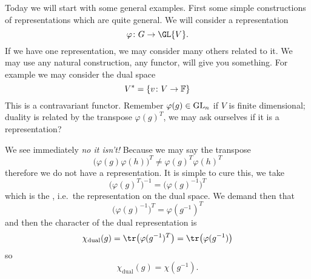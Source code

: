 
Today we will start with some general examples. First some simple
constructions of representations which are quite general. We will
consider a representation
\begin{equation}
\varphi\colon G\to\GL{V}.
\end{equation}
If we have one representation, we may consider many others
related to it. We may use any natural construction, any functor,
will give you something. For example we may consider the dual
space 
\begin{equation}
V^{*}=\left\{ v\colon V\to\Bbb{F}\right\}
\end{equation}
This is a contravariant functor. Remember $\varphi(g)\in{\rm
  GL}_{n}$ if $V$ is finite dimensional; duality is related by
the transpose $\varphi(g)^{T}$, we may ask ourselves if it is a
representation?

We see immediately \emph{no it isn't!} Because we may say the
transpose
\begin{equation}
\big(\varphi(g)\varphi(h)\big)^{T}\not=\varphi(g)^{T}\varphi(h)^{T}
\end{equation}
therefore we do not have a representation. It is simple to cure
this, we take
\begin{equation}
\big(\varphi(g)^{T}\big)^{-1}=\big(\varphi(g)^{-1}\big)^{T}
\end{equation}
which is the , i.e.\ the
representation on the dual space. We demand then that
\begin{equation}
\big(\varphi(g)^{-1}\big)^{T}=\varphi(g^{-1})^{T}
\end{equation}
and then the character of the dual representation is
\begin{equation}
\chi_{\text{dual}}(g)=\tr\big(\varphi(g^{-1})^{T}\big)=\tr\big(\varphi(g^{-1})\big)
\end{equation}
so
\begin{equation}
\chi_{\text{dual}}(g)=\chi(g^{-1}).
\end{equation}

